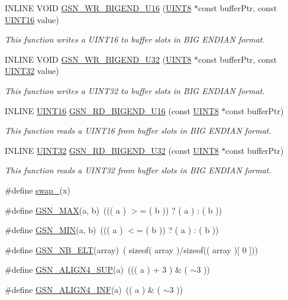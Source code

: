 \begin{DoxyCompactItemize}
INLINE VOID \hyperlink{a00634_ga33948c00f14501bc1db7b052d0c5f349}{GSN\_\-WR\_\-BIGEND\_\-U16} (\hyperlink{a00660_gab27e9918b538ce9d8ca692479b375b6a}{UINT8} $\ast$const bufferPtr, const \hyperlink{a00660_ga09f1a1fb2293e33483cc8d44aefb1eb1}{UINT16} value)
\begin{DoxyCompactList}\small\item\em This function writes a UINT16 to buffer slots in BIG ENDIAN format. \end{DoxyCompactList}\item 
INLINE VOID \hyperlink{a00634_ga60ab53941c9f097c11682045248d549d}{GSN\_\-WR\_\-BIGEND\_\-U32} (\hyperlink{a00660_gab27e9918b538ce9d8ca692479b375b6a}{UINT8} $\ast$const bufferPtr, const \hyperlink{a00660_gae1e6edbbc26d6fbc71a90190d0266018}{UINT32} value)
\begin{DoxyCompactList}\small\item\em This function writes a UINT32 to buffer slots in BIG ENDIAN format. \end{DoxyCompactList}\item 
INLINE \hyperlink{a00660_ga09f1a1fb2293e33483cc8d44aefb1eb1}{UINT16} \hyperlink{a00634_ga56b3884cf803598729efac09feda672e}{GSN\_\-RD\_\-BIGEND\_\-U16} (const \hyperlink{a00660_gab27e9918b538ce9d8ca692479b375b6a}{UINT8} $\ast$const bufferPtr)
\begin{DoxyCompactList}\small\item\em This function reads a UINT16 from buffer slots in BIG ENDIAN format. \end{DoxyCompactList}\item 
INLINE \hyperlink{a00660_gae1e6edbbc26d6fbc71a90190d0266018}{UINT32} \hyperlink{a00634_gae9bb82c2969564282b416ad9981dc542}{GSN\_\-RD\_\-BIGEND\_\-U32} (const \hyperlink{a00660_gab27e9918b538ce9d8ca692479b375b6a}{UINT8} $\ast$const bufferPtr)
\begin{DoxyCompactList}\small\item\em This function reads a UINT32 from buffer slots in BIG ENDIAN format. \end{DoxyCompactList}\item 
\#define \hyperlink{a00634_gab2242ecb8ffd8b5fb6a1647a5b1c9f2a}{swap\_}(x)
\item 
\#define \hyperlink{a00634_ga1eb2a90e9ab14824a64a2f6a62b37890}{GSN\_\-MAX}(a, b)~((( a ) $>$= ( b )) ? ( a ) : ( b ))
\item 
\#define \hyperlink{a00634_gaca41fe743680cba6df3cbecbc9ab08a9}{GSN\_\-MIN}(a, b)~((( a ) $<$= ( b )) ? ( a ) : ( b ))
\item 
\#define \hyperlink{a00634_ga98384a3c4b654dfd7254b0ff4cfb425b}{GSN\_\-NB\_\-ELT}(array)~( sizeof( array )/sizeof(( array )\mbox{[} 0 \mbox{]}))
\item 
\#define \hyperlink{a00634_ga3f85373e426f9724f7a911dfbd36e090}{GSN\_\-ALIGN4\_\-SUP}(a)~((( a ) + 3 ) \& ( $\sim$3 ))
\item 
\#define \hyperlink{a00634_ga38c4278d40641d58d348be55a4fd91da}{GSN\_\-ALIGN4\_\-INF}(a)~(( a ) \& ( $\sim$3 ))
\end{DoxyCompactItemize}



